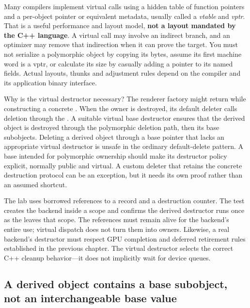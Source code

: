 Many compilers implement virtual calls using a hidden table of function pointers and a per-object pointer or equivalent metadata, usually called a \emph{vtable} and \emph{vptr}. That is a useful performance and layout model, \textbf{not a layout mandated by the C++ language}. A virtual call may involve an indirect branch, and an optimizer may remove that indirection when it can prove the target. You must not serialize a polymorphic object by copying its bytes, assume its first machine word is a vptr, or calculate its size by casually adding a pointer to its named fields. Actual layouts, thunks and adjustment rules depend on the compiler and its application binary interface.

Why is the virtual destructor necessary? The renderer factory might return  while constructing a concrete . When the owner is destroyed, its default deleter calls deletion through the . A suitable virtual base destructor ensures that the derived object is destroyed through the polymorphic deletion path, then its base subobjects. Deleting a derived object through a base pointer that lacks an appropriate virtual destructor is unsafe in the ordinary default-delete pattern. A base intended for polymorphic ownership should make its destructor policy explicit, normally public and virtual. A custom deleter that retains the concrete destruction protocol can be an exception, but it needs its own proof rather than an assumed shortcut.

The lab uses borrowed references to a  record and a destruction counter. The test creates the backend inside a scope and confirms the derived destructor runs once as the  leaves that scope. The references must remain alive for the backend's entire use; virtual dispatch does not turn them into owners. Likewise, a real backend's destructor must respect GPU completion and deferred retirement rules established in the previous chapter. The virtual destructor selects the correct C++ cleanup behavior---it does not implicitly wait for device queues.

\subsection{A derived object contains a base subobject, not an interchangeable base value}\label{05-engine-i-ch004-a-derived-object-contains-a-base-subobject-not-an-interchangeable-base-value}

